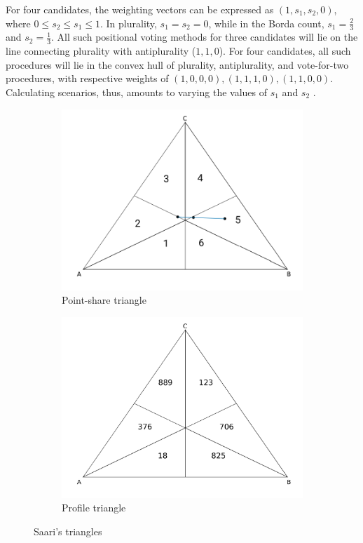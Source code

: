 \documentclass[hidelinks,11pt]{article} \usepackage[utf8]{inputenc}
\begin{document}
For four candidates, the weighting vectors can be expressed as \((1,s_{1},s_{2},0)\), where \(0 \leq s_{2} \leq s_{1} \leq 1\). In plurality, \(s_{1} = s_{2} = 0\), while in the Borda count, \(s_{1} = \frac{2}{3}\) and \(s_{2} = \frac{1}{3}\). All such positional voting methods for three candidates will lie on the line connecting plurality with antiplurality (\(1,1,0\)). For four candidates, all such procedures will lie in the convex hull of plurality, antiplurality, and vote-for-two procedures, with respective weights of \((1,0,0,0), (1,1,1,0), (1,1,0,0)\). Calculating scenarios, thus, amounts to varying the values of \(s_{1}\) and \(s_{2}\)
\parencite{saari1995basic, saari2001chaotic}.


\begin{figure}[!h] \centering
  \begin{subfigure}[b]{0.49\textwidth} \centering
\includegraphics[width=\textwidth]{./images/simpletriangle.png}
 \caption{Point-share triangle}
 \label{fig:pointshare}
\end{subfigure} \hfill
  \begin{subfigure}[b]{0.49\textwidth} \centering
\includegraphics[width=\textwidth]{./images/representation_triangle_noth}
 \caption{Profile triangle}
 \label{fig:representation}
\end{subfigure}
\caption{Saari's triangles}
\label{fig:saari_nurmi}
\end{figure}
\end{document}
